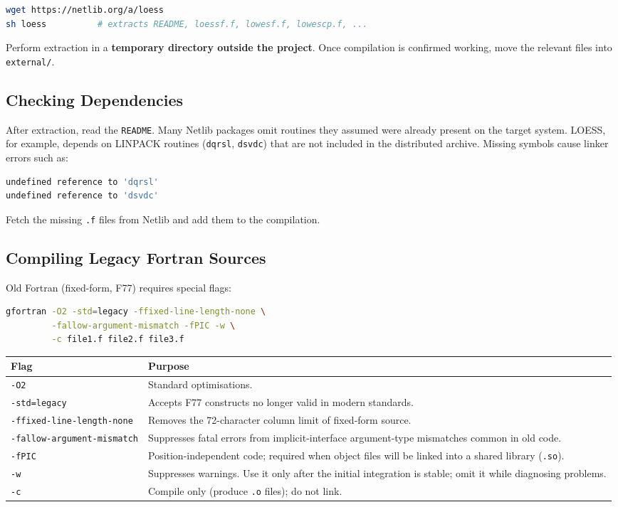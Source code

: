 \documentclass{article}
\begin{document}
\begin{lstlisting}[language=bash]
wget https://netlib.org/a/loess
sh loess          # extracts README, loessf.f, lowesf.f, lowescp.f, ...
\end{lstlisting}

Perform extraction in a \textbf{temporary directory outside the project}. Once compilation is confirmed working, move the relevant files into \texttt{external/}.

\subsection{Checking Dependencies}

After extraction, read the \texttt{README}. Many Netlib packages omit routines they assumed were already present on the target system. LOESS, for example, depends on LINPACK routines (\texttt{dqrsl}, \texttt{dsvdc}) that are not included in the distributed archive. Missing symbols cause linker errors such as:

\begin{lstlisting}[language=bash]
undefined reference to 'dqrsl'
undefined reference to 'dsvdc'
\end{lstlisting}

Fetch the missing \texttt{.f} files from Netlib and add them to the compilation.

\subsection{Compiling Legacy Fortran Sources}

Old Fortran (fixed-form, F77) requires special flags:

\begin{lstlisting}[language=bash]
gfortran -O2 -std=legacy -ffixed-line-length-none \
         -fallow-argument-mismatch -fPIC -w \
         -c file1.f file2.f file3.f
\end{lstlisting}

\begin{tabular}{lp{9.5cm}}
\toprule
Flag & Purpose \\
\midrule
\texttt{-O2} & Standard optimisations. \\
\texttt{-std=legacy} & Accepts F77 constructs no longer valid in modern standards. \\
\texttt{-ffixed-line-length-none} & Removes the 72-character column limit of fixed-form source. \\
\texttt{-fallow-argument-mismatch} & Suppresses fatal errors from implicit-interface argument-type mismatches common in old code. \\
\texttt{-fPIC} & Position-independent code; required when object files will be linked into a shared library (\texttt{.so}). \\
\texttt{-w} & Suppresses warnings. Use it only after the initial integration is stable; omit it while diagnosing problems. \\
\texttt{-c} & Compile only (produce \texttt{.o} files); do not link. \\
\bottomrule
\end{tabular}
\end{document}
